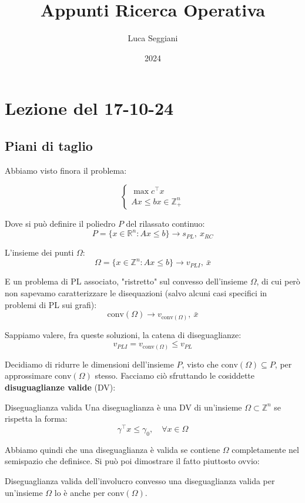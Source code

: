 \documentclass[a4paper,11pt]{article}
\title{Appunti Ricerca Operativa}
\author{Luca Seggiani}
\date{2024}
\begin{document}
\section{Lezione del 17-10-24}

\thispagestyle{empty}
\pagestyle{fancy}


\subsection{Piani di taglio}

Abbiamo visto finora il problema:

\[
	\begin{cases}
		\max c^\intercal x \\
		Ax \leq b
		x \in \mathbb{Z}^n_+
	\end{cases}
\]

Dove si può definire il poliedro $P$ del rilassato continuo:
$$
P = \{ x \in \mathbb{R}^n : Ax \leq b \} \rightarrow s_{PL}, \ x_{RC}
$$

L'insieme dei punti $\Omega$:
$$
\Omega = \{ x \in \mathbb{Z}^n : Ax \leq b \} \rightarrow v_{PLI}, \ \bar{x}
$$

E un problema di PL associato, "ristretto" sul convesso dell'insieme $\Omega$, di cui però non sapevamo caratterizzare le disequazioni (salvo alcuni casi specifici in problemi di PL sui grafi): 
$$
\mathrm{conv}(\Omega) \rightarrow v_{\mathrm{conv}(\Omega)}, \ \bar{x} 
$$

Sappiamo valere, fra queste soluzioni, la catena di diseguaglianze:
$$ v_{PLI} = v_{\mathrm{conv}(\Omega)} \leq v_{PL} $$

Decidiamo di ridurre le dimensioni dell'insieme $P$, visto che $\mathrm{conv}(\Omega) \subseteq P$, per approssimare $\mathrm{conv}(\Omega)$ stesso.
Facciamo ciò sfruttando le cosiddette \textbf{disuguaglianze valide} (DV):
\begin{definition}{Diseguaglianza valida}
	Una diseguaglianza è una DV di un'insieme $\Omega \subset \mathbb{Z}^n$ se rispetta la forma:
	$$ \gamma^\intercal x \leq \gamma_0, \quad \forall x \in \Omega $$
\end{definition}

Abbiamo quindi che una diseguaglianza è valida se contiene $\Omega$ completamente nel semispazio che definisce.
Si può poi dimostrare il fatto piuttosto ovvio:

\begin{theorem}{Diseguaglianza valida dell'involucro convesso}	
una diseguaglianza valida per un'insieme $\Omega$ lo è anche per $\mathrm{conv}(\Omega)$.
\end{theorem}
\end{document}
